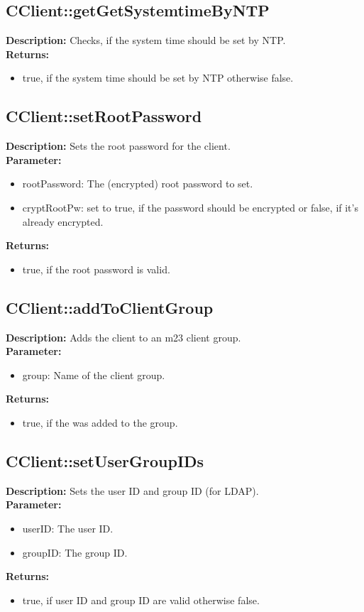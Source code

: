 \subsection{CClient::getGetSystemtimeByNTP}
\textbf{Description:} Checks, if the system time should be set by NTP.\\
\textbf{Returns:}
\begin{itemize}
\item true, if the system time should be set by NTP otherwise false.
\end{itemize}

\subsection{CClient::setRootPassword}
\textbf{Description:} Sets the root password for the client.\\
\textbf{Parameter:}
\begin{itemize}
\item rootPassword: The (encrypted) root password to set.
\item cryptRootPw: set to true, if the password should be encrypted or false, if it's already encrypted.
\end{itemize}
\textbf{Returns:}
\begin{itemize}
\item true, if the root password is valid.
\end{itemize}

\subsection{CClient::addToClientGroup}
\textbf{Description:} Adds the client to an m23 client group.\\
\textbf{Parameter:}
\begin{itemize}
\item group: Name of the client group.
\end{itemize}
\textbf{Returns:}
\begin{itemize}
\item true, if the was added to the group.
\end{itemize}

\subsection{CClient::setUserGroupIDs}
\textbf{Description:} Sets the user ID and group ID (for LDAP).\\
\textbf{Parameter:}
\begin{itemize}
\item userID: The user ID.
\item groupID: The group ID.
\end{itemize}
\textbf{Returns:}
\begin{itemize}
\item true, if user ID and group ID are valid otherwise false.
\end{itemize}

